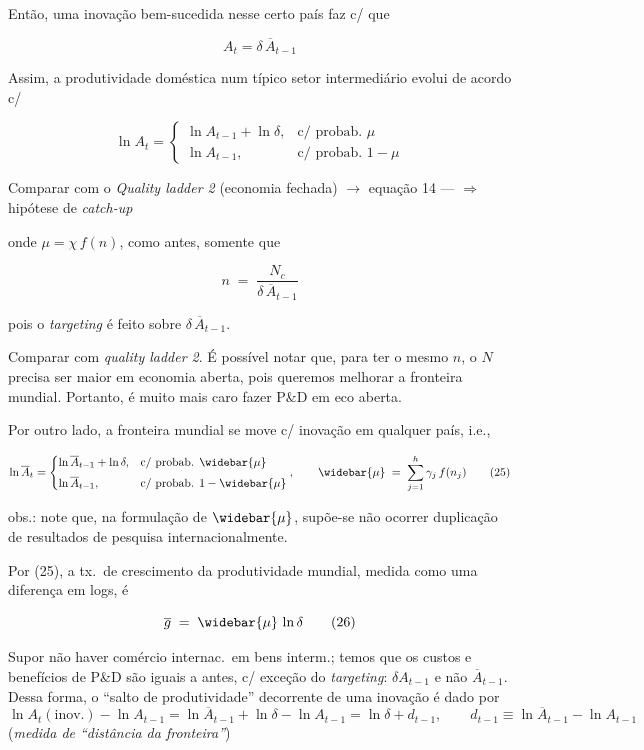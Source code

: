 \documentclass[a4paper,12pt]{article}[abntex2]
\begin{document}
Então, uma inovação bem-sucedida nesse certo país faz c/ que

\[
A_{t} = \delta\,\overline{A}_{t-1}
\]

Assim, a produtividade doméstica num típico setor intermediário evolui de acordo c/

\[
\ln A_{t} =
\begin{cases}
\ln A_{t-1} + \ln\delta, & \text{c/ probab. } \mu\\[4pt]
\ln A_{t-1}, & \text{c/ probab. } 1-\mu
\end{cases}
\tag{23}
\]

\noindent\footnotesize Comparar com o \emph{Quality ladder 2} (economia fechada) $\rightarrow$ equação 14 —
$\Rightarrow$ hipótese de \emph{catch-up}\normalsize


onde $\mu = \chi\,f(n)$, como antes, somente que

\[
n \;=\; \frac{N_c}{\delta\,\overline{A}_{t-1}}
\tag{24}
\]

pois o \emph{targeting} é feito sobre $\delta\,\overline{A}_{t-1}$.

Comparar com \emph{quality ladder 2}.  
É possível notar que, para ter o mesmo $n$, o $N$ precisa ser maior em economia aberta,
pois queremos melhorar a fronteira mundial.  
Portanto, é muito mais caro fazer P\&D em eco aberta.


Por outro lado, a fronteira mundial se move c/ inovação em qualquer país, i.e.,

\[
\ln \overline{A}_{t} =
\begin{cases}
\ln \overline{A}_{t-1} + \ln\delta, & \text{c/ probab. } \widebar{\mu}\\[4pt]
\ln \overline{A}_{t-1}, & \text{c/ probab. } 1-\widebar{\mu}
\end{cases}
,
\qquad
\widebar{\mu} \;=\; \sum_{j=1}^{h} \gamma_{j}\,f(n_{j})
\tag{25}
\]

\noindent obs.: note que, na formulação de $\widebar{\mu}$, supõe-se não ocorrer duplicação de
resultados de pesquisa internacionalmente.


Por (25), a tx.\ de crescimento da produtividade mundial, medida como uma diferença em logs, é

\[
\overline{g} \;=\; \widebar{\mu}\,\ln\delta
\tag{26}
\]

Supor não haver comércio internac.\ em bens interm.; temos que os custos e benefícios de P\&D são iguais a antes, c/ exceção do \emph{targeting}: $\delta A_{t-1}$ e não $\overline{A}_{t-1}$.  
Dessa forma, o “salto de produtividade” decorrente de uma inovação é dado por
\[
\ln A_{t}(\text{inov.})-\ln A_{t-1}
   =\ln\overline{A}_{t-1}+\ln\delta-\ln A_{t-1}
   =\ln\delta+d_{t-1},
\qquad
d_{t-1}\equiv\ln\overline{A}_{t-1}-\ln A_{t-1}
\tag{27}
\]
(\emph{medida de “distância da fronteira”})
\end{document}

